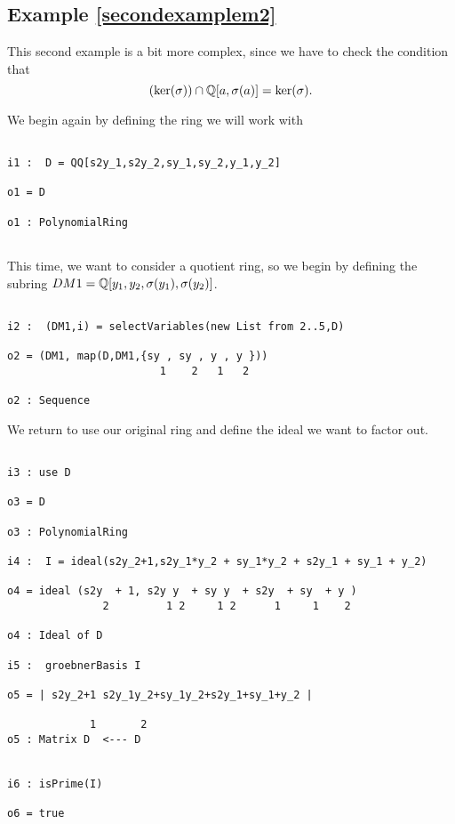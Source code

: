 \subsection{Example \ref{secondexamplem2}}

This second example is a bit more complex, since we have to check the condition that
$$(\ker(\sigma)) \cap \mathbb{Q}[a,\sigma(a)] = \ker(\sigma).$$

We begin again by defining the ring we will work with

\begin{lstlisting}

i1 :  D = QQ[s2y_1,s2y_2,sy_1,sy_2,y_1,y_2]

o1 = D

o1 : PolynomialRing


\end{lstlisting}

This time, we want to consider a quotient ring, so we begin by defining the subring $DM1 = \mathbb{Q}[y_1,y_2,\sigma(y_1),\sigma(y_2)]$.

\begin{lstlisting}

i2 :  (DM1,i) = selectVariables(new List from 2..5,D)

o2 = (DM1, map(D,DM1,{sy , sy , y , y }))
                        1    2   1   2

o2 : Sequence

\end{lstlisting}

We return to use our original ring and define the ideal we want to factor out.

\begin{lstlisting}

i3 : use D

o3 = D

o3 : PolynomialRing

i4 :  I = ideal(s2y_2+1,s2y_1*y_2 + sy_1*y_2 + s2y_1 + sy_1 + y_2)

o4 = ideal (s2y  + 1, s2y y  + sy y  + s2y  + sy  + y )
               2         1 2     1 2      1     1    2

o4 : Ideal of D

i5 :  groebnerBasis I

o5 = | s2y_2+1 s2y_1y_2+sy_1y_2+s2y_1+sy_1+y_2 |

             1       2
o5 : Matrix D  <--- D


i6 : isPrime(I)

o6 = true


\end{lstlisting}

